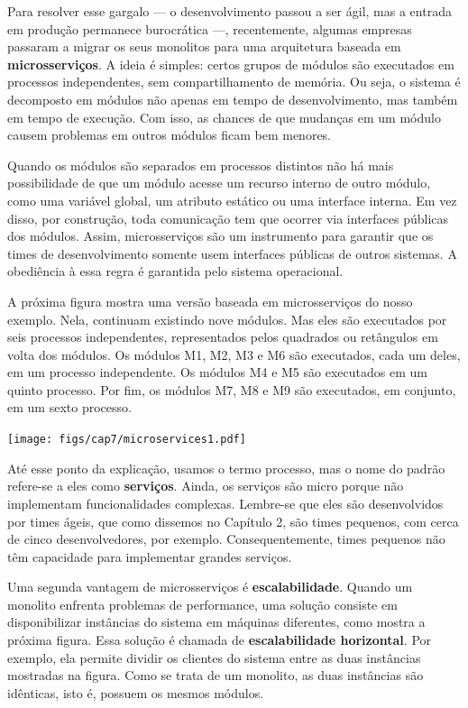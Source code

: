 \documentclass[
  11pt,
  twoside]{book}
\let\origfigure\figure
\let\endorigfigure\endfigure
\renewenvironment{figure}[1][2] {
    \expandafter\origfigure\expandafter[!h]
} {
    \endorigfigure
}
\begin{document}
Para resolver esse gargalo --- o desenvolvimento passou a ser ágil, mas
a entrada em produção permanece burocrática ---, recentemente, algumas
empresas passaram a migrar os seus monolitos para uma arquitetura
baseada em \textbf{microsserviços}. A ideia é simples: certos grupos de
módulos são executados em processos independentes, sem compartilhamento
de memória. Ou seja, o sistema é decomposto em módulos não apenas em
tempo de desenvolvimento, mas também em tempo de execução. Com isso, as
chances de que mudanças em um módulo causem problemas em outros módulos
ficam bem menores.

Quando os módulos são separados em processos distintos não há mais
possibilidade de que um módulo acesse um recurso interno de outro
módulo, como uma variável global, um atributo estático ou uma interface
interna. Em vez disso, por construção, toda comunicação tem que ocorrer
via interfaces públicas dos módulos. Assim, microsserviços são um
instrumento para garantir que os times de desenvolvimento somente usem
interfaces públicas de outros sistemas. A obediência à essa regra é
garantida pelo sistema operacional.

A próxima figura mostra uma versão baseada em microsserviços do nosso
exemplo. Nela, continuam existindo nove módulos. Mas eles são executados
por seis processos independentes, representados pelos quadrados ou
retângulos em volta dos módulos. Os módulos M1, M2, M3 e M6 são
executados, cada um deles, em um processo independente. Os módulos M4 e
M5 são executados em um quinto processo. Por fim, os módulos M7, M8 e M9
são executados, em conjunto, em um sexto processo.

\begin{figure}
\centering
\texttt{[image: figs/cap7/microservices1.pdf]}
\caption{Servidor com seis microsserviços: M1, M2, M3, M4-M5, M6,
M7-M8-M9. Cada microsserviço executa como um processo autônomo.}
\end{figure}

Até esse ponto da explicação, usamos o termo processo, mas o nome do
padrão refere-se a eles como \textbf{serviços}. Ainda, os serviços são
micro porque não implementam funcionalidades complexas. Lembre-se que
eles são desenvolvidos por times ágeis, que como dissemos no Capítulo 2,
são times pequenos, com cerca de cinco desenvolvedores, por exemplo.
Consequentemente, times pequenos não têm capacidade para implementar
grandes serviços.

 
 Uma segunda vantagem de microsserviços
é \textbf{escalabilidade}. Quando um monolito enfrenta problemas de
performance, uma solução consiste em disponibilizar instâncias do
sistema em máquinas diferentes, como mostra a próxima figura. Essa
solução é chamada de \textbf{escalabilidade horizontal}. Por exemplo,
ela permite dividir os clientes do sistema entre as duas instâncias
mostradas na figura. Como se trata de um monolito, as duas instâncias
são idênticas, isto é, possuem os mesmos módulos.
\end{document}
